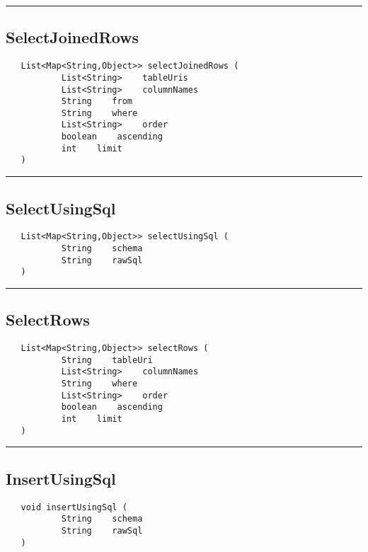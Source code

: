 \rule{15cm}{2pt}
\subsection{SelectJoinedRows}
\label{Api:SelectJoinedRows}
\begin{verbatim}
   List<Map<String,Object>> selectJoinedRows (
           List<String>    tableUris
           List<String>    columnNames
           String    from
           String    where
           List<String>    order
           boolean    ascending
           int    limit
   )
\end{verbatim}



\rule{15cm}{2pt}
\subsection{SelectUsingSql}
\label{Api:SelectUsingSql}
\begin{verbatim}
   List<Map<String,Object>> selectUsingSql (
           String    schema
           String    rawSql
   )
\end{verbatim}



\rule{15cm}{2pt}
\subsection{SelectRows}
\label{Api:SelectRows}
\begin{verbatim}
   List<Map<String,Object>> selectRows (
           String    tableUri
           List<String>    columnNames
           String    where
           List<String>    order
           boolean    ascending
           int    limit
   )
\end{verbatim}



\rule{15cm}{2pt}
\subsection{InsertUsingSql}
\label{Api:InsertUsingSql}
\begin{verbatim}
   void insertUsingSql (
           String    schema
           String    rawSql
   )
\end{verbatim}



